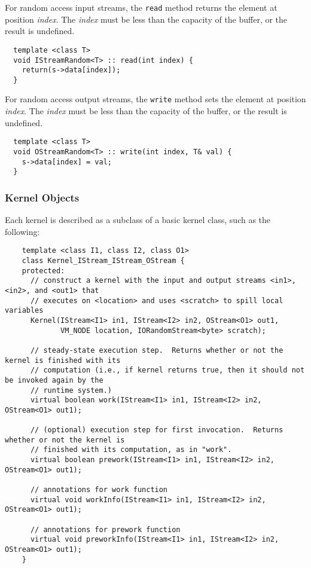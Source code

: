  For random access input streams, the {\tt read} method
returns the element at position {\it index}.  The {\it index} must be
less than the capacity of the buffer, or the result is undefined.

{\small
\begin{verbatim}
  template <class T>
  void IStreamRandom<T> :: read(int index) {
    return(s->data[index]);
  }
\end{verbatim}}

 For random access output streams, the {\tt write} method
sets the element at position {\it index}.  The {\it index} must be
less than the capacity of the buffer, or the result is undefined.

{\small
\begin{verbatim}
  template <class T>
  void OStreamRandom<T> :: write(int index, T& val) {
    s->data[index] = val;
  }
\end{verbatim}}

\subsubsection{Kernel Objects}
\label{sec:kernels}

Each kernel is described as a subclass of a basic kernel class, such
as the following:
{\small
\begin{verbatim}
    template <class I1, class I2, class O1>
    class Kernel_IStream_IStream_OStream {
    protected:
      // construct a kernel with the input and output streams <in1>, <in2>, and <out1> that
      // executes on <location> and uses <scratch> to spill local variables
      Kernel(IStream<I1> in1, IStream<I2> in2, OStream<O1> out1, 
             VM_NODE location, IORandomStream<byte> scratch);

      // steady-state execution step.  Returns whether or not the kernel is finished with its
      // computation (i.e., if kernel returns true, then it should not be invoked again by the
      // runtime system.)
      virtual boolean work(IStream<I1> in1, IStream<I2> in2, OStream<O1> out1);

      // (optional) execution step for first invocation.  Returns whether or not the kernel is
      // finished with its computation, as in "work".
      virtual boolean prework(IStream<I1> in1, IStream<I2> in2, OStream<O1> out1);

      // annotations for work function
      virtual void workInfo(IStream<I1> in1, IStream<I2> in2, OStream<O1> out1);

      // annotations for prework function
      virtual void preworkInfo(IStream<I1> in1, IStream<I2> in2, OStream<O1> out1);
    }  
\end{verbatim}}

